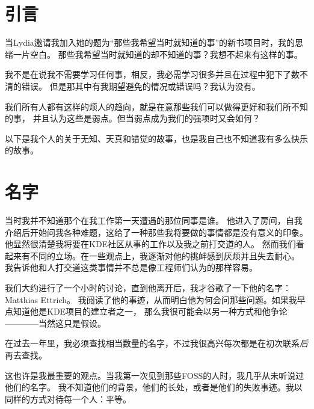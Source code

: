 

\section*{引言}

当Lydia邀请我加入她的题为“那些我希望当时就知道的事”的新书项目时，我的思绪一片空白。
那些我希望当时就知道的却不知道的事？我想不起来有这样的事。

我不是在说我不需要学习任何事，相反，我必需学习很多并且在过程中犯下了数不清的错误。
但是那其中有我期望避免的情况或错误吗？我认为没有。

我们所有人都有这样的烦人的趋向，就是在意那些我们可以做得更好和我们所不知的事，
并且认为这些是弱点。但当弱点成为我们的强项时又会如何？

以下是我个人的关于无知、天真和错觉的故事，也是我自己也不知道我有多么快乐的故事。

\section*{名字}

当时我并不知道那个在我工作第一天遭遇的那位同事是谁。
他进入了房间，自我介绍后开始问我各种难题，这给了一种那些我将要做的事情都是没有意义的印象。
他显然很清楚我将要在KDE社区从事的工作以及我之前打交道的人。
然而我们看起来有不同的立场。在一些观点上，我逐渐对他的挑衅感到厌烦并且失去耐心。
我告诉他和人打交道这类事情并不总是像工程师们认为的那样容易。

我们大约进行了一个小时的讨论，直到他离开后，我才谷歌了一下他的名字：Matthias Ettrich。
我阅读了他的事迹，从而明白他为何会问那些问题。如果我早点知道他是KDE项目的建立者之一，
那么我很可能会以另一种方式和他争论————当然这只是假设。

在过去一年里，我必须查找相当数量的名字，不过我很高兴每次都是在初次联系\textit{后}再去查找。

这也许是我最重要的观点。当我第一次见到那些FOSS的人时，我几乎从未听说过他们的名字。
我不知道他们的背景，他们的长处，或者是他们的失败事迹。我以同样的方式对待每一个人：平等。

